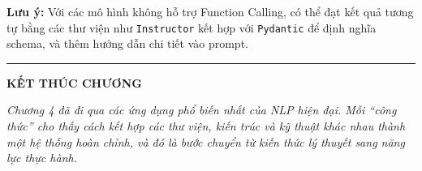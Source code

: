 \textbf{Lưu ý:} Với các mô hình không hỗ trợ Function Calling, có thể đạt kết quả tương tự bằng các thư viện như \texttt{Instructor} kết hợp với \texttt{Pydantic} để định nghĩa schema, và thêm hướng dẫn chi tiết vào prompt.

\bigskip
\hrule
\bigskip

\begin{center}
    \textbf{\Large KẾT THÚC CHƯƠNG \thechapter}
\end{center}

\textit{Chương 4 đã đi qua các ứng dụng phổ biến nhất của NLP hiện đại. Mỗi “công thức” cho thấy cách kết hợp các thư viện, kiến trúc và kỹ thuật khác nhau thành một hệ thống hoàn chỉnh, và đó là bước chuyển từ kiến thức lý thuyết sang năng lực thực hành.}
